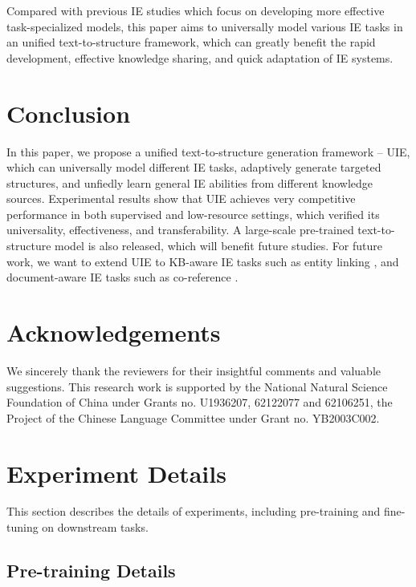 \documentclass[11pt]{article}
\begin{document}
Compared with previous IE studies which focus on developing more effective task-specialized models, this paper aims to universally model various IE tasks in an unified text-to-structure framework, which can greatly benefit the rapid development, effective knowledge sharing, and quick adaptation of IE systems.
 
\section{Conclusion} \label{sec:conclusion}

In this paper, we propose a unified text-to-structure generation framework – UIE, which can universally model different IE tasks, adaptively generate targeted structures, and unfiedly learn general IE abilities from different knowledge sources.
Experimental results show that UIE achieves very competitive performance in both supervised and low-resource settings, which verified its universality, effectiveness, and transferability.
A large-scale pre-trained text-to-structure model is also released, which will benefit future studies. For future work, we want to extend UIE to KB-aware IE tasks such as entity linking \citep{cao2021autoregressive}, and document-aware IE tasks such as co-reference \citep{lee-etal-2017-end, LU2022103632}.
 \section*{Acknowledgements}
We sincerely thank the reviewers for their insightful comments and valuable suggestions.
This research work is supported by the National Natural Science Foundation of China under Grants no. U1936207, 62122077 and 62106251, the Project of the Chinese Language Committee under Grant no. YB2003C002. 



\newpage
\appendix


\section{Experiment Details} \label{sec:experiment_data}

This section describes the details of experiments, including pre-training and fine-tuning on downstream tasks.

\subsection{Pre-training Details} \label{sec:pretrain_details}
\end{document}

